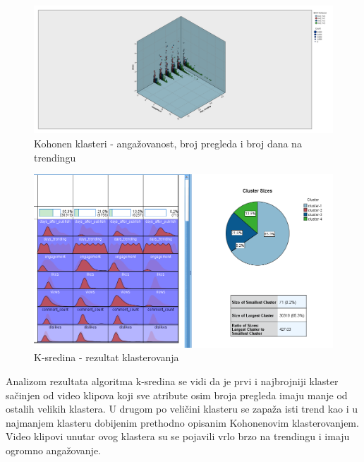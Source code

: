 \documentclass[a4paper]{article}
\theoremstyle{definition}
\begin{document}
\begin{figure}[H]
\begin{center}
    \includegraphics[width=1\textwidth]{Kohonen_engagement_views_days_trending.png}
    \caption{Kohonen klasteri - angažovanost, broj pregleda i broj dana na trendingu}
     \label{fig:asoc2}
\end{center}
\end{figure}



\begin{figure}[H]
\begin{center}
    \includegraphics[width=1\textwidth]{Kmeans.png}
    \caption{K-sredina - rezultat klasterovanja}
     \label{fig:asoc2}
\end{center}
\end{figure}

Analizom rezultata algoritma k-sredina se vidi da je prvi i najbrojniji klaster sačinjen od video klipova koji sve atribute osim broja pregleda imaju manje od ostalih velikih klastera.
U drugom po veličini klasteru se zapaža isti trend kao i u najmanjem klasteru dobijenim prethodno opisanim Kohonenovim klasterovanjem. Video klipovi unutar ovog klastera
su se pojavili vrlo brzo na trendingu i imaju ogromno angažovanje. 
\end{document}
